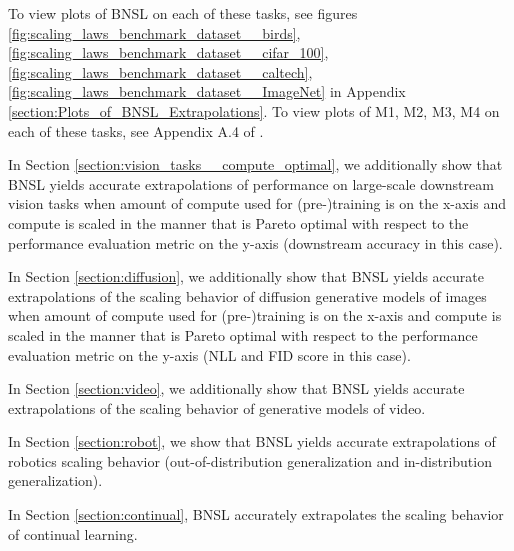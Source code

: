 \documentclass{article} %
\begin{document}
To view plots of BNSL on each of these tasks, see figures
\ref{fig:scaling_laws_benchmark_dataset__birds},
\ref{fig:scaling_laws_benchmark_dataset__cifar_100},
\ref{fig:scaling_laws_benchmark_dataset__caltech},
\ref{fig:scaling_laws_benchmark_dataset__ImageNet} in Appendix \ref{section:Plots_of_BNSL_Extrapolations}. To view plots of M1, M2, M3, M4 on each of these tasks, see Appendix A.4 of \cite{Alabdulmohsi2022revisiting}.

\vspace{-0.7mm}

In Section \ref{section:vision_tasks__compute_optimal}, we additionally show that BNSL yields accurate extrapolations of performance on large-scale downstream vision tasks when amount of compute used for (pre-)training is on the x-axis and compute is scaled in the manner that is Pareto optimal with respect to the performance evaluation metric on the y-axis (downstream accuracy in this case).

\vspace{-2.2mm}

In Section \ref{section:diffusion}, we additionally show that BNSL yields accurate extrapolations of the scaling behavior of diffusion generative models of images when amount of compute used for (pre-)training is on the x-axis and compute is scaled in the manner that is Pareto optimal with respect to the performance evaluation metric on the y-axis (NLL and FID score in this case).

\vspace{-2.2mm}

In Section \ref{section:video}, we additionally show that BNSL yields accurate extrapolations of the scaling behavior of generative models of video.

\vspace{-2.2mm}

In Section \ref{section:robot}, we show that BNSL yields accurate extrapolations of robotics scaling behavior (out-of-distribution generalization and in-distribution generalization).

\vspace{-2.2mm}


In Section \ref{section:continual}, BNSL accurately extrapolates the scaling behavior of continual learning.

\vspace{-2.2mm}
\end{document}

